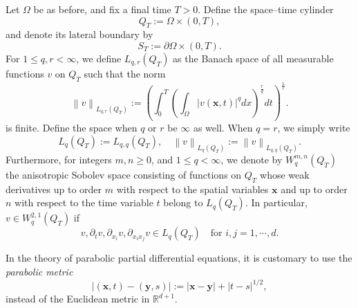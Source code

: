 \documentclass[final,onefignum,onetabnum]{mousaviart}
\begin{document}
	Let $\Omega$ be as before, and fix a final time $T>0$.
	Define the space–time cylinder
	\[
	Q_T:= \Omega \times (0,T),
	\]
	and denote its lateral boundary by
	\[
	S_T:= \partial \Omega \times (0,T).
	\]
	For $1 \leq q, r <\infty$, we define $L_{q, r}(Q_T)$ as the Banach space of all measurable functions $v$ on $Q_T$ such that the norm
	\[
	\left\|
	v \right\|_{L_{q,r}(Q_T)}:=
	\left( \int_{0}^{T}{\left( \int_{\Omega}{\left| v(\boldsymbol{x}, t) \right|^q }dx \right)^{\frac{r}{q}} }dt
	\right)^{\frac{1}{r}}.  
	\]
	is finite. {\color{red} Define the space when $q$ or $r$ be $\infty$ as well.}
	When $q=r$, we simply write
	\[
	L_q(Q_T):= L_{q,q}(Q_T),
	\quad
	\left\| v \right\|_{L_q(Q_T)}:= \left\| v \right\|_{L_{q,q}(Q_T)}.
	\]
	Furthermore, for integers $m, n \geq 0$, and $1\leq q < \infty$, we denote by $W^{m,n}_q(Q_T)$ the anisotropic Sobolev space consisting of functions on $Q_T$ whose weak derivatives up to order $m$ with respect to the spatial variables $\boldsymbol{x}$ and up to order $n$ with respect to the time variable $t$ belong to $L_{q}(Q_T)$. In particular, $v \in W^{2,1}_q(Q_T)$ if 
	\[
		v, \partial_t v, \partial_{x_i}v , \partial_{x_i x_j}v \in L_q(Q_T)
		\quad
		\text{for }
		i, j = 1, \cdots, d.
	\]
	\begin{remark}
		In the theory of parabolic partial differential equations, it is customary to use the \emph{parabolic metric}
		\[
		\left| (\boldsymbol{x}, t) - (\boldsymbol{y}, s) \right|:= \left| \boldsymbol{x} - \boldsymbol{y} \right| + \left| t - s \right|^{1/2}, 
		\]
		instead of the Euclidean metric in $\mathbb{R}^{d+1}$.
	\end{remark}
\end{document}
